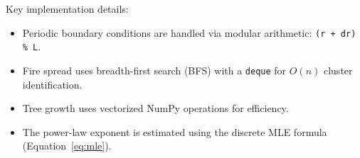 \documentclass[12pt, a4paper, twocolumn]{article}
\begin{document}
Key implementation details:
\begin{itemize}[leftmargin=*]
    \item Periodic boundary conditions are handled via modular arithmetic: \texttt{(r + dr) \% L}.
    \item Fire spread uses breadth-first search (BFS) with a \texttt{deque} for $O(n)$ cluster identification.
    \item Tree growth uses vectorized NumPy operations for efficiency.
    \item The power-law exponent is estimated using the discrete MLE formula (Equation~\ref{eq:mle}).
\end{itemize}
\end{document}
